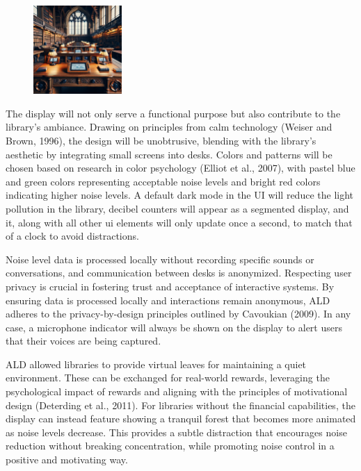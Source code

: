 \documentclass{novel}
\begin{document}
\begin{figure} 
    \includegraphics[width=0.3\textwidth]{resources/deskDevice.jpg}
\end{figure}
The display will not only serve a functional purpose but also contribute to the library's ambiance. Drawing on principles from calm technology (Weiser and Brown, 1996), the design will be unobtrusive, blending with the library's aesthetic by integrating small screens into desks. Colors and patterns will be chosen based on research in color psychology (Elliot et al., 2007), with pastel blue and green colors representing acceptable noise levels and bright red colors indicating higher noise levels. A default dark mode in the UI will reduce the light pollution in the library, decibel counters will appear as a segmented display, and it, along with all other ui elements will only update once a second, to match that of a clock to avoid distractions.

Noise level data is processed locally without recording specific sounds or conversations, and communication between desks is anonymized. Respecting user privacy is crucial in fostering trust and acceptance of interactive systems. By ensuring data is processed locally and interactions remain anonymous, ALD adheres to the privacy-by-design principles outlined by Cavoukian (2009). In any case, a microphone indicator will always be shown on the display to alert users that their voices are being captured.

ALD allowed libraries to provide virtual leaves for maintaining a quiet environment. These can be exchanged for real-world rewards, leveraging the psychological impact of rewards and aligning with the principles of motivational design (Deterding et al., 2011). For libraries without the financial capabilities, the display can instead feature showing a tranquil forest that becomes more animated as noise levels decrease. This provides a subtle distraction that encourages noise reduction without breaking concentration, while promoting noise control in a positive and motivating way.
\end{document}
